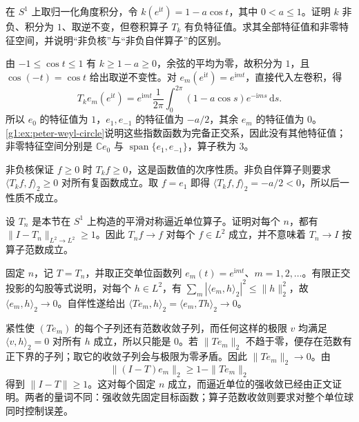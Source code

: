 \begin{exercise}\label{g1:ex:nonnegative-kernel-negative-spectrum}
	在 \(S^1\) 上取归一化角度积分，令 \(k(e^{\mathrm{i}t})=1-a\cos t\)，其中 \(0<a\le1\)。证明 \(k\) 非负、积分为 \(1\)、取逆不变，但卷积算子 \(T_k\) 有负特征值。求其全部特征值和非零特征空间，并说明“非负核”与“非负自伴算子”的区别。
\end{exercise}
\begin{solution}
	由 \(-1\le\cos t\le1\) 有 \(k\ge1-a\ge0\)，余弦的平均为零，故积分为 \(1\)，且 \(\cos(-t)=\cos t\) 给出取逆不变性。对 \(e_m(e^{\mathrm{i}t})=e^{\mathrm{i}mt}\)，直接代入左卷积，得
	\[
		T_ke_m(e^{\mathrm{i}t})
		=e^{\mathrm{i}mt}\frac1{2\pi}\int_0^{2\pi}
		(1-a\cos s)e^{-\mathrm{i}ms}\,\mathrm{d}s.
	\]
	所以 \(e_0\) 的特征值为 \(1\)，\(e_1,e_{-1}\) 的特征值为 \(-a/2\)，其余 \(e_m\) 的特征值为 \(0\)。\cref{g1:ex:peter-weyl-circle}说明这些指数函数为完备正交系，因此没有其他特征值；非零特征空间分别是 \(\mathbb C e_0\) 与 \(\operatorname{span}\{e_1,e_{-1}\}\)，算子秩为 \(3\)。

	非负核保证 \(f\ge0\) 时 \(T_kf\ge0\)，这是函数值的次序性质。非负自伴算子则要求 \(\langle T_kf,f\rangle_2\ge0\) 对所有复函数成立。取 \(f=e_1\) 即得 \(\langle T_kf,f\rangle_2=-a/2<0\)，所以后一性质不成立。
\end{solution}

\begin{exercise}\label{g1:ex:approximate-identity-not-operator-norm}
	设 \(T_n\) 是本节在 \(S^1\) 上构造的平滑对称逼近单位算子。证明对每个 \(n\)，都有 \(\|I-T_n\|_{L^2\to L^2}\ge1\)。因此 \(T_nf\to f\) 对每个 \(f\in L^2\) 成立，并不意味着 \(T_n\to I\) 按算子范数成立。
\end{exercise}
\begin{solution}
	固定 \(n\)，记 \(T=T_n\)，并取正交单位函数列 \(e_m(t)=e^{\mathrm{i}mt}\)、\(m=1,2,\ldots\)。有限正交投影的勾股等式说明，对每个 \(h\in L^2\)，有 \(\sum_m|\langle e_m,h\rangle_2|^2\le\|h\|_2^2\)，故 \(\langle e_m,h\rangle_2\to0\)。自伴性遂给出 \(\langle Te_m,h\rangle_2=\langle e_m,Th\rangle_2\to0\)。

	紧性使 \((Te_m)\) 的每个子列还有范数收敛子列，而任何这样的极限 \(v\) 均满足 \(\langle v,h\rangle_2=0\) 对所有 \(h\) 成立，所以只能是 \(0\)。若 \(\|Te_m\|_2\) 不趋于零，便存在范数有正下界的子列；取它的收敛子列会与极限为零矛盾。因此 \(\|Te_m\|_2\to0\)。由
	\[
		\|(I-T)e_m\|_2\ge1-\|Te_m\|_2
	\]
	得到 \(\|I-T\|\ge1\)。这对每个固定 \(n\) 成立，而逼近单位的强收敛已经由正文证明。两者的量词不同：强收敛先固定目标函数；算子范数收敛则要求对整个单位球同时控制误差。
\end{solution}

